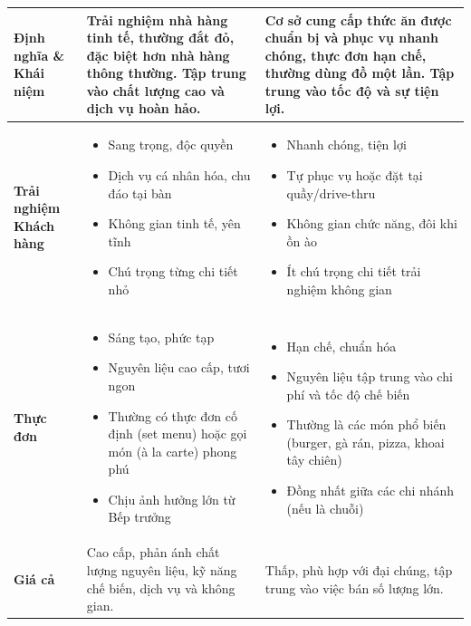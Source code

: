 \begin{longtable}{| m{3.5cm} | >{\RaggedRight}m{6.5cm} | >{\RaggedRight}m{6.5cm} |}
\textbf{Định nghĩa \& Khái niệm} & Trải nghiệm nhà hàng tinh tế, thường đắt đỏ, đặc biệt hơn nhà hàng thông thường. Tập trung vào chất lượng cao và dịch vụ hoàn hảo. & Cơ sở cung cấp thức ăn được chuẩn bị và phục vụ nhanh chóng, thực đơn hạn chế, thường dùng đồ một lần. Tập trung vào tốc độ và sự tiện lợi. \\
\hline
\textbf{Trải nghiệm Khách hàng} & \begin{itemize} \item Sang trọng, độc quyền \item Dịch vụ cá nhân hóa, chu đáo tại bàn \item Không gian tinh tế, yên tĩnh \item Chú trọng từng chi tiết nhỏ \end{itemize} & \begin{itemize} \item Nhanh chóng, tiện lợi \item Tự phục vụ hoặc đặt tại quầy/drive-thru \item Không gian chức năng, đôi khi ồn ào \item Ít chú trọng chi tiết trải nghiệm không gian \end{itemize} \\
\hline
\textbf{Thực đơn} & \begin{itemize} \item Sáng tạo, phức tạp \item Nguyên liệu cao cấp, tươi ngon \item Thường có thực đơn cố định (set menu) hoặc gọi món (à la carte) phong phú \item Chịu ảnh hưởng lớn từ Bếp trưởng \end{itemize} & \begin{itemize} \item Hạn chế, chuẩn hóa \item Nguyên liệu tập trung vào chi phí và tốc độ chế biến \item Thường là các món phổ biến (burger, gà rán, pizza, khoai tây chiên) \item Đồng nhất giữa các chi nhánh (nếu là chuỗi) \end{itemize} \\
\hline
\textbf{Giá cả} & Cao cấp, phản ánh chất lượng nguyên liệu, kỹ năng chế biến, dịch vụ và không gian. & Thấp, phù hợp với đại chúng, tập trung vào việc bán số lượng lớn. \\
\hline

\end{longtable}

